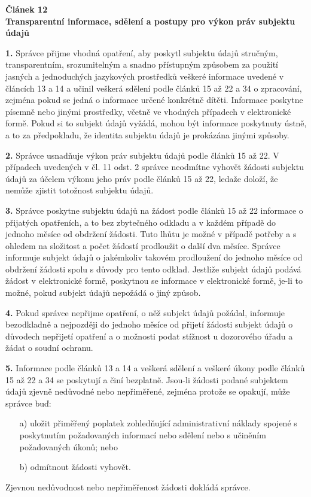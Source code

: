 \begin{displayquote}
  \textbf{Článek 12} \\
  \textbf{Transparentní informace, sdělení a postupy pro výkon práv subjektu údajů}

  \textbf{1.} Správce přijme vhodná opatření, aby poskytl subjektu údajů stručným, transparentním, srozumitelným a snadno přístupným způsobem za použití jasných a jednoduchých jazykových prostředků veškeré informace uvedené v článcích 13 a 14 a učinil veškerá sdělení podle článků 15 až 22 a 34 o zpracování, zejména pokud se jedná o informace určené konkrétně dítěti. Informace poskytne písemně nebo jinými prostředky, včetně ve vhodných případech v elektronické formě. Pokud si to subjekt údajů vyžádá, mohou být informace poskytnuty ústně, a to za předpokladu, že identita subjektu údajů je prokázána jinými způsoby.

  \vspace{0.5em}
  \textbf{2.} Správce usnadňuje výkon práv subjektu údajů podle článků 15 až 22. V případech uvedených v čl. 11 odst. 2 správce neodmítne vyhovět žádosti subjektu údajů za účelem výkonu jeho práv podle článků 15 až 22, ledaže doloží, že nemůže zjistit totožnost subjektu údajů.

  \vspace{0.5em}
  \textbf{3.} Správce poskytne subjektu údajů na žádost podle článků 15 až 22 informace o přijatých opatřeních, a to bez zbytečného odkladu a v každém případě do jednoho měsíce od obdržení žádosti. Tuto lhůtu je možné v případě potřeby a s ohledem na složitost a počet žádostí prodloužit o další dva měsíce. Správce informuje subjekt údajů o jakémkoliv takovém prodloužení do jednoho měsíce od obdržení žádosti spolu s důvody pro tento odklad. Jestliže subjekt údajů podává žádost v elektronické formě, poskytnou se informace v elektronické formě, je-li to možné, pokud subjekt údajů nepožádá o jiný způsob.

  \vspace{0.5em}
  \textbf{4.} Pokud správce nepřijme opatření, o něž subjekt údajů požádal, informuje bezodkladně a nejpozději do jednoho měsíce od přijetí žádosti subjekt údajů o důvodech nepřijetí opatření a o možnosti podat stížnost u dozorového úřadu a žádat o soudní ochranu.

  \vspace{0.5em}
  \textbf{5.} Informace podle článků 13 a 14 a veškerá sdělení a veškeré úkony podle článků 15 až 22 a 34 se poskytují a činí bezplatně. Jsou-li žádosti podané subjektem údajů zjevně nedůvodné nebo nepřiměřené, zejména protože se opakují, může správce buď:
  \begin{itemize}
    \item[a)] uložit přiměřený poplatek zohledňující administrativní náklady spojené s poskytnutím požadovaných informací nebo sdělení nebo s učiněním požadovaných úkonů; nebo
  \item[b)] odmítnout žádosti vyhovět.
\end{itemize}
Zjevnou nedůvodnost nebo nepřiměřenost žádosti dokládá správce.


\end{displayquote}
